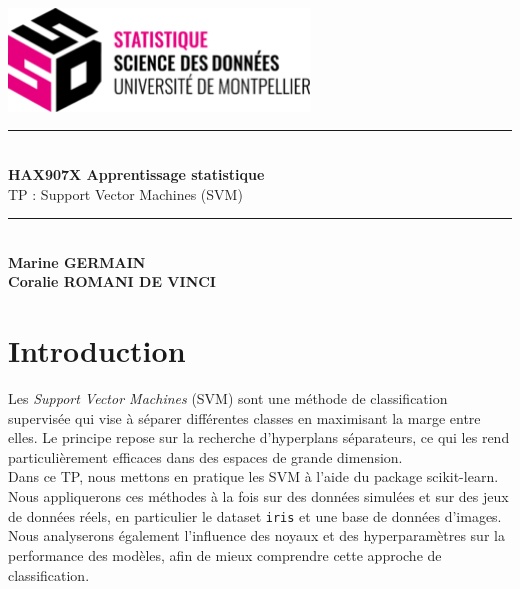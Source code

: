 \documentclass[a4paper,12pt]{article}
\begin{document}
\begin{titlepage}

    \vspace*{4cm}

    \centering
    
    \includegraphics[width=0.6\textwidth]{Images/logo.png} \\[1.5cm]
    
    \rule{\linewidth}{1pt} \\[1cm]

    {\Huge \bfseries HAX907X Apprentissage statistique}\\[0.5cm]
    {\Huge TP : Support Vector Machines (SVM)}\\[1cm]
    
    \rule{\linewidth}{1pt} \\[2cm]

    {\Large \textbf{Marine GERMAIN}}\\
    {\Large \textbf{Coralie ROMANI DE VINCI}}\\[1cm]
    

\end{titlepage}


\renewcommand{\contentsname}{Table des matières}
\tableofcontents


\newpage

\section{Introduction}

Les \emph{Support Vector Machines} (SVM) sont une méthode de classification supervisée qui vise à séparer différentes classes en maximisant la marge entre elles. Le principe repose sur la recherche d’hyperplans séparateurs, ce qui les rend particulièrement efficaces dans des espaces de grande dimension.\\

Dans ce TP, nous mettons en pratique les SVM à l’aide du package scikit-learn. Nous appliquerons ces méthodes à la fois sur des données simulées et sur des jeux de données réels, en particulier le dataset \texttt{iris} et une base de données d'images. 
Nous analyserons également l’influence des noyaux et des hyperparamètres sur la performance des modèles, afin de mieux comprendre cette approche de classification.
\end{document}

